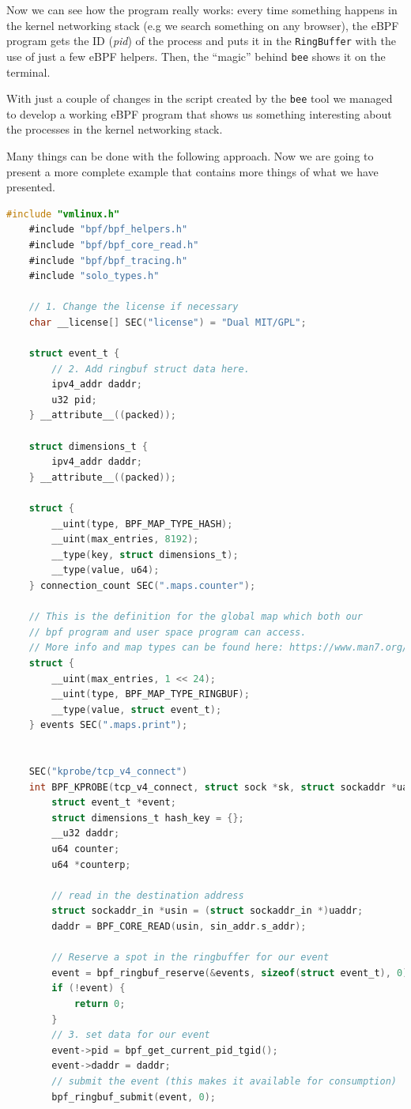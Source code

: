 Now we can see how the program really works: every time something happens in the kernel networking stack (e.g we search something on any browser), the eBPF program gets the ID (\textit{pid}) of the process and puts it in the \verb|RingBuffer| with the use of just a few eBPF helpers.
Then, the ``magic'' behind \verb|bee| shows it on the terminal.

With just a couple of changes in the script created by the \verb|bee| tool we managed to develop a working eBPF program that shows us something interesting about the processes in the kernel networking stack.

Many things can be done with the following approach.
Now we are going to present a more complete example that contains more things of what we have presented.

\begin{lstlisting}[language=C, caption={bee complete program}]
	#include "vmlinux.h"
	#include "bpf/bpf_helpers.h"
	#include "bpf/bpf_core_read.h"
	#include "bpf/bpf_tracing.h"
	#include "solo_types.h"
	
	// 1. Change the license if necessary 
	char __license[] SEC("license") = "Dual MIT/GPL";
	
	struct event_t {
		// 2. Add ringbuf struct data here.
		ipv4_addr daddr;
		u32 pid;
	} __attribute__((packed));
	
	struct dimensions_t {
		ipv4_addr daddr;
	} __attribute__((packed));
	
	struct {
		__uint(type, BPF_MAP_TYPE_HASH);
		__uint(max_entries, 8192);
		__type(key, struct dimensions_t);
		__type(value, u64);
	} connection_count SEC(".maps.counter");
	
	// This is the definition for the global map which both our
	// bpf program and user space program can access.
	// More info and map types can be found here: https://www.man7.org/linux/man-pages/man2/bpf.2.html
	struct {
		__uint(max_entries, 1 << 24);
		__uint(type, BPF_MAP_TYPE_RINGBUF);
		__type(value, struct event_t);
	} events SEC(".maps.print");
	
	
	SEC("kprobe/tcp_v4_connect")
	int BPF_KPROBE(tcp_v4_connect, struct sock *sk, struct sockaddr *uaddr) {
		struct event_t *event;
		struct dimensions_t hash_key = {};
		__u32 daddr;
		u64 counter;
		u64 *counterp;
		
		// read in the destination address
		struct sockaddr_in *usin = (struct sockaddr_in *)uaddr;
		daddr = BPF_CORE_READ(usin, sin_addr.s_addr);
		
		// Reserve a spot in the ringbuffer for our event
		event = bpf_ringbuf_reserve(&events, sizeof(struct event_t), 0);
		if (!event) {
			return 0;
		}
		// 3. set data for our event
		event->pid = bpf_get_current_pid_tgid();
		event->daddr = daddr;
		// submit the event (this makes it available for consumption)
		bpf_ringbuf_submit(event, 0);
		

\end{lstlisting}
